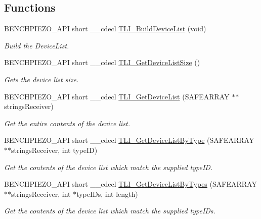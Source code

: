 \subsection*{Functions}
\begin{DoxyCompactItemize}
\item 
B\+E\+N\+C\+H\+P\+I\+E\+Z\+O\+\_\+\+A\+PI short \+\_\+\+\_\+cdecl \hyperlink{group___benchtop_piezo_gabd8d6e7c5ac04ea9a9107cae2f2f662e}{T\+L\+I\+\_\+\+Build\+Device\+List} (void)
\begin{DoxyCompactList}\small\item\em Build the Device\+List. \end{DoxyCompactList}\item 
B\+E\+N\+C\+H\+P\+I\+E\+Z\+O\+\_\+\+A\+PI short \+\_\+\+\_\+cdecl \hyperlink{group___benchtop_piezo_ga15c823cbf22c07ff0a5cf2a7d3f8597a}{T\+L\+I\+\_\+\+Get\+Device\+List\+Size} ()
\begin{DoxyCompactList}\small\item\em Gets the device list size. \end{DoxyCompactList}\item 
B\+E\+N\+C\+H\+P\+I\+E\+Z\+O\+\_\+\+A\+PI short \+\_\+\+\_\+cdecl \hyperlink{group___benchtop_piezo_gae3d1c25e1b387122c1600a24ff4f674e}{T\+L\+I\+\_\+\+Get\+Device\+List} (S\+A\+F\+E\+A\+R\+R\+AY $\ast$$\ast$strings\+Receiver)
\begin{DoxyCompactList}\small\item\em Get the entire contents of the device list. \end{DoxyCompactList}\item 
B\+E\+N\+C\+H\+P\+I\+E\+Z\+O\+\_\+\+A\+PI short \+\_\+\+\_\+cdecl \hyperlink{group___benchtop_piezo_gad7f13d4c222320e84fba53cb960356cc}{T\+L\+I\+\_\+\+Get\+Device\+List\+By\+Type} (S\+A\+F\+E\+A\+R\+R\+AY $\ast$$\ast$strings\+Receiver, int type\+ID)
\begin{DoxyCompactList}\small\item\em Get the contents of the device list which match the supplied type\+ID. \end{DoxyCompactList}\item 
B\+E\+N\+C\+H\+P\+I\+E\+Z\+O\+\_\+\+A\+PI short \+\_\+\+\_\+cdecl \hyperlink{group___benchtop_piezo_ga813574fb20d46cab3e6a8b0e2a45c605}{T\+L\+I\+\_\+\+Get\+Device\+List\+By\+Types} (S\+A\+F\+E\+A\+R\+R\+AY $\ast$$\ast$strings\+Receiver, int $\ast$type\+I\+Ds, int length)
\begin{DoxyCompactList}\small\item\em Get the contents of the device list which match the supplied type\+I\+Ds. \end{DoxyCompactList}\item 
$$
\end{DoxyCompactItemize}
